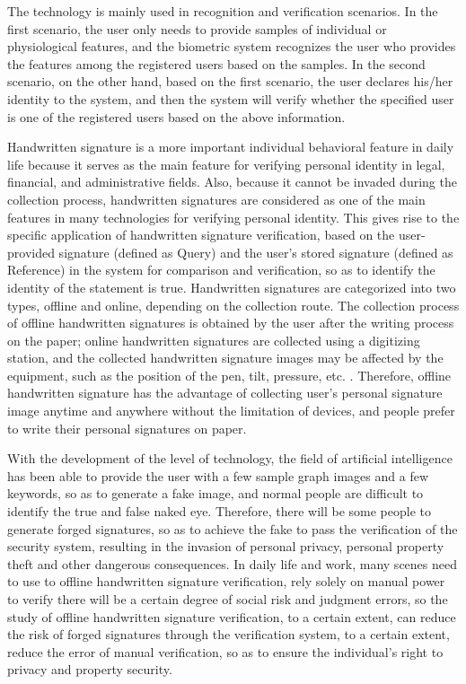 \documentclass{article}
\begin{document}
The technology is mainly used in recognition and verification scenarios. In the first scenario, the user only needs to provide samples of individual or physiological features, and the biometric system recognizes the user who provides the features among the registered users based on the samples. In the second scenario, on the other hand, based on the first scenario, the user declares his/her identity to the system, and then the system will verify whether the specified user is one of the registered users based on the above information.

Handwritten signature is a more important individual behavioral feature in daily life because it serves as the main feature for verifying personal identity in legal, financial, and administrative fields. Also, because it cannot be invaded during the collection process, handwritten signatures are considered as one of the main features in many technologies for verifying personal identity. This gives rise to the specific application of handwritten signature verification, based on the user-provided signature (defined as Query) and the user's stored signature (defined as Reference) in the system for comparison and verification, so as to identify the identity of the statement is true.
Handwritten signatures are categorized into two types, offline and online, depending on the collection route. The collection process of offline handwritten signatures is obtained by the user after the writing process on the paper; online handwritten signatures are collected using a digitizing station, and the collected handwritten signature images may be affected by the equipment, such as the position of the pen, tilt, pressure, etc. \cite{3}. Therefore, offline handwritten signature has the advantage of collecting user's personal signature image anytime and anywhere without the limitation of devices, and people prefer to write their personal signatures on paper.

With the development of the level of technology, the field of artificial intelligence has been able to provide the user with a few sample graph images and a few keywords, so as to generate a fake image, and normal people are difficult to identify the true and false naked eye. Therefore, there will be some people to generate forged signatures, so as to achieve the fake to pass the verification of the security system, resulting in the invasion of personal privacy, personal property theft and other dangerous consequences. In daily life and work, many scenes need to use to offline handwritten signature verification, rely solely on manual power to verify there will be a certain degree of social risk and judgment errors, so the study of offline handwritten signature verification, to a certain extent, can reduce the risk of forged signatures through the verification system, to a certain extent, reduce the error of manual verification, so as to ensure the individual's right to privacy and property security.
\end{document}

